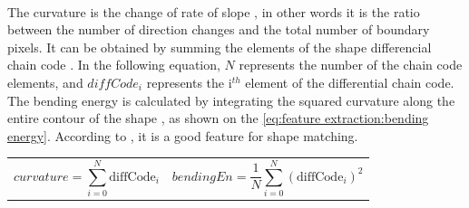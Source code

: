 ~~ 

The curvature is the change of rate of slope \cite{bib:chain:ObjectDescription}, in other words it is the ratio between the number of direction changes and the total number of boundary pixels. It can be obtained by summing the elements of the shape differencial chain code  \cite{bib:chain:ShapeRepresentationDescription}. In the following equation, $N$ represents the number of the chain code elements, and $diffCode_i$ represents the i$^{th}$ element of the differential chain code. The bending energy is calculated by integrating the squared curvature along the entire contour of the shape \cite{bib:chain:ShapeRepresentationDescription}, as shown on the \vref{eq:feature extraction:bending energy}. According to \cite{bib:chain:ShapeDescriptionLesson}, it is a good feature for shape matching. 

\noindent\begin{tabularx}{\textwidth}{@{}XX@{}}
	\begin{equation}
		curvature = \sum_{i = 0}^{N} \text{diffCode}_i
	\end{equation} & 
	\begin{equation} \label{eq:feature extraction:bending energy}
		bendingEn = \frac{1}{N} \sum_{i = 0}^{N} (\text{diffCode}_i)^{2}
	\end{equation}
\end{tabularx}






